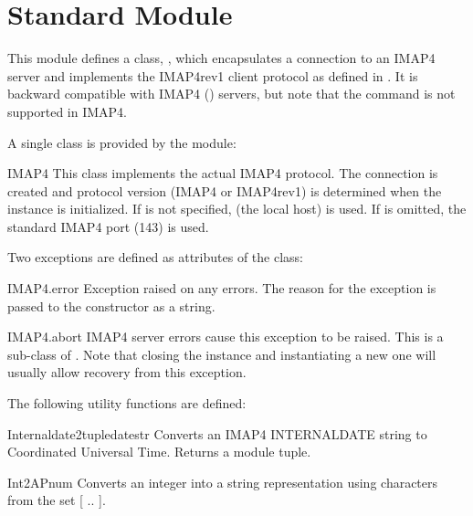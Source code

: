 %

\section{Standard Module }
\label{module-imaplib}

This module defines a class, , which encapsulates a
connection to an IMAP4 server and implements the IMAP4rev1 client
protocol as defined in . It is backward compatible with
IMAP4 () servers, but note that the  command is
not supported in IMAP4.

A single class is provided by the  module:

\begin{classdesc}{IMAP4}{}
This class implements the actual IMAP4 protocol.  The connection is
created and protocol version (IMAP4 or IMAP4rev1) is determined when
the instance is initialized.
If  is not specified,  (the local host) is used.
If  is omitted, the standard IMAP4 port (143) is used.
\end{classdesc}

Two exceptions are defined as attributes of the  class:

\begin{excdesc}{IMAP4.error}
Exception raised on any errors.  The reason for the exception is
passed to the constructor as a string.
\end{excdesc}

\begin{excdesc}{IMAP4.abort}
IMAP4 server errors cause this exception to be raised.  This is a
sub-class of .  Note that closing the instance
and instantiating a new one will usually allow recovery from this
exception.
\end{excdesc}

The following utility functions are defined:

\begin{funcdesc}{Internaldate2tuple}{datestr}
  Converts an IMAP4 INTERNALDATE string to Coordinated Universal
  Time. Returns a  module tuple.
\end{funcdesc}

\begin{funcdesc}{Int2AP}{num}
  Converts an integer into a string representation using characters
  from the set [ .. ].
\end{funcdesc}

